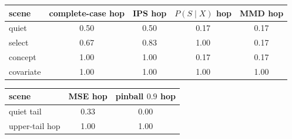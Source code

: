 \begin{tabular}{@{}lcccc@{}}
\toprule
scene & complete-case hop & IPS hop & $P(S\mid X)$ hop & MMD hop \\
\midrule
quiet & 0.50 & 0.50 & 0.17 & 0.17 \\
select & 0.67 & 0.83 & 1.00 & 0.17 \\
concept & 1.00 & 1.00 & 0.17 & 0.17 \\
covariate & 1.00 & 1.00 & 1.00 & 1.00 \\
\bottomrule
\end{tabular}
\vspace{1.1em}
\begin{tabular}{@{}lcc@{}}
\toprule
scene & MSE hop & pinball $0.9$ hop \\
\midrule
quiet tail & 0.33 & 0.00 \\
upper-tail hop & 1.00 & 1.00 \\
\bottomrule
\end{tabular}